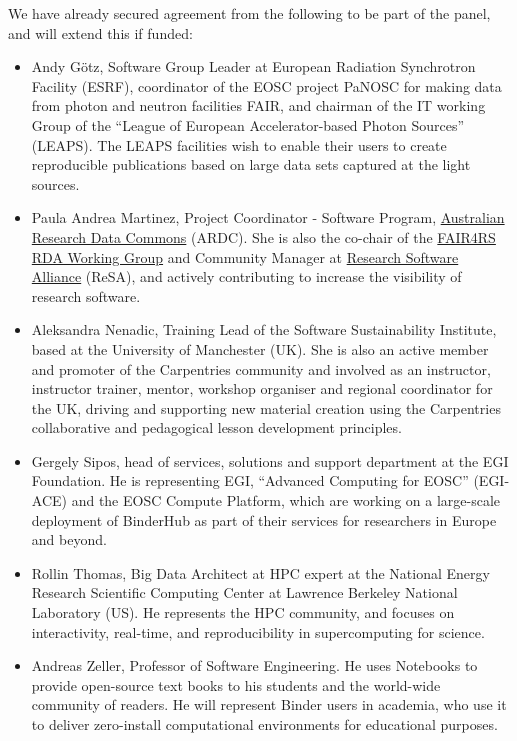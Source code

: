 We have already secured agreement from the following to be part of the panel,
and will extend this if funded:
\begin{itemize}
\item Andy Götz, Software Group Leader at European Radiation Synchrotron
  Facility (ESRF), coordinator of the EOSC project PaNOSC for making data from
  photon and neutron facilities FAIR, and chairman of the IT working Group of
  the ``League of European Accelerator-based Photon Sources'' (LEAPS). The LEAPS
  facilities wish to enable their users to create reproducible publications
  based on large data sets captured at the light sources.
\item Paula Andrea Martinez, Project Coordinator - Software Program, \href{https://ardc.edu.au/}{Australian Research Data Commons} (ARDC).
She is also the co-chair of the \href{https://www.rd-alliance.org/groups/fair-research-software-fair4rs-wg}{FAIR4RS RDA Working Group} and
Community Manager at \href{https://www.researchsoft.org/}{Research Software Alliance} (ReSA), and actively contributing
to increase the visibility of research software.
\item Aleksandra Nenadic, Training Lead of the Software Sustainability Institute, 
based at the University of Manchester (UK). She is also an active member and 
promoter of the Carpentries community and involved as an instructor, 
instructor trainer, mentor, workshop organiser and regional coordinator 
for the UK, driving and supporting new material creation using the 
Carpentries collaborative and pedagogical lesson development principles.
\item Gergely Sipos, head of services, solutions and support department at the
  EGI Foundation. He is representing EGI, ``Advanced Computing for EOSC''
  (EGI-ACE) and the EOSC Compute Platform, which are working on a large-scale
  deployment of BinderHub as part of their services for researchers in Europe
  and beyond.
\item Rollin Thomas, Big Data Architect at HPC expert at the National Energy
  Research Scientific Computing Center at Lawrence Berkeley National Laboratory
  (US). He represents the HPC community, and focuses on interactivity,
  real-time, and reproducibility in supercomputing for science.
\item Andreas Zeller, Professor of Software Engineering. He uses Notebooks 
  to provide open-source text books to his students and the world-wide
  community of readers. He will represent Binder users in academia, who use it 
  to deliver zero-install computational environments for educational
  purposes.
\end{itemize}
